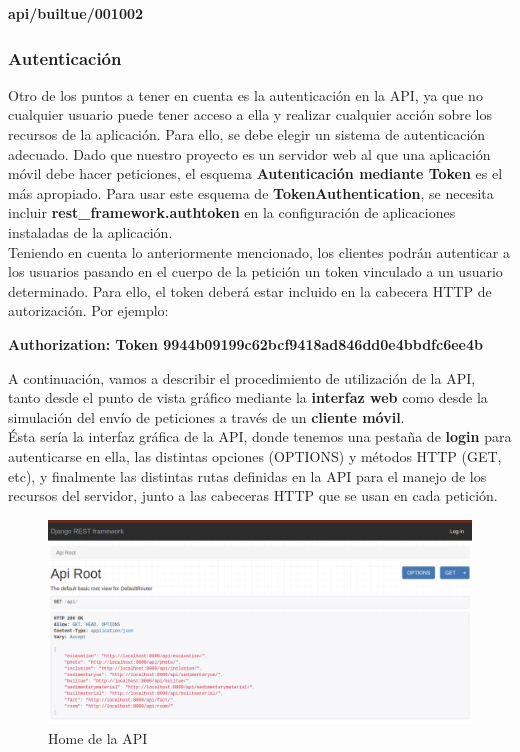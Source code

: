             \begin{center} \textbf{api/builtue/001002} \end{center}

\subsubsection{Autenticación}
Otro de los puntos a tener en cuenta es la autenticación en la API, ya que no cualquier
usuario puede tener acceso a ella y realizar cualquier acción sobre los recursos de la
aplicación. Para ello, se debe elegir un sistema de autenticación adecuado. Dado que
nuestro proyecto es un servidor web al que una aplicación móvil debe hacer peticiones,
el esquema \textbf{Autenticación mediante Token} es el más apropiado. Para usar este
esquema de \textbf{TokenAuthentication}, se necesita incluir \textbf{rest\_framework.authtoken}
en la configuración de aplicaciones instaladas de la aplicación.\\

Teniendo en cuenta lo anteriormente mencionado, los clientes podrán autenticar a los usuarios
pasando en el cuerpo de la petición un token vinculado a un usuario determinado. Para
ello, el token deberá estar incluido en la cabecera HTTP de autorización. Por ejemplo:

\begin{center}
    \textbf{Authorization: Token 9944b09199c62bcf9418ad846dd0e4bbdfc6ee4b}
\end{center}

A continuación, vamos a describir el procedimiento de utilización de la API, tanto desde el
punto de vista gráfico mediante la \textbf{interfaz web} como desde la simulación del envío
de peticiones a través de un \textbf{cliente móvil}.\\

Ésta sería la interfaz gráfica de la API, donde tenemos una pestaña de \textbf{login} para
autenticarse en ella, las distintas opciones (OPTIONS) y métodos HTTP (GET, etc), y
finalmente las distintas rutas definidas en la API para el manejo de los recursos del
servidor, junto a las cabeceras HTTP que se usan en cada petición.

        \begin{figure}[H]
            \centering
            \includegraphics[scale=0.30]{imagenes/root-api.png}
            \caption{Home de la API}
            \label{fig:root-api}
        \end{figure}

